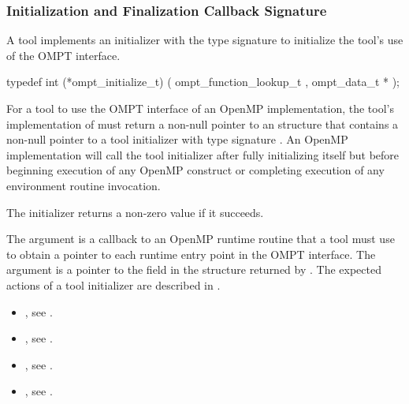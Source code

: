 \subsubsection{Initialization and Finalization Callback Signature}

\label{sec:ompt_initialize_t}

\summary
A tool implements an initializer with the type signature
 to initialize the tool's use of
the OMPT interface.

\format

\begin{ccppspecific}
\begin{omptInquiry}
typedef int (*ompt_initialize_t) (
  ompt_function_lookup_t ,
  ompt_data_t *
);
\end{omptInquiry}
\end{ccppspecific}


\descr
For a tool to use the OMPT interface of an OpenMP implementation,
the tool's implementation of  must return a
non-null pointer to an
 structure that contains a
non-null pointer to a tool initializer with
type signature .
An OpenMP implementation will call the tool initializer
after fully initializing itself but before
beginning execution of any OpenMP construct
or completing execution of any environment routine invocation.

The initializer returns a non-zero value if it succeeds.

\argdesc
The argument  is a callback
to an OpenMP runtime routine that a tool must use to
obtain a pointer to each runtime entry point in the OMPT interface.
The argument  is a pointer to the
 field in the 
structure returned by .
The expected actions of a tool initializer are described in
.

\crossreferences
\begin{itemize}
\item {}, see
  .
\item {}, see .
\item {}, see
  .
\item {}, see .
\end{itemize}


